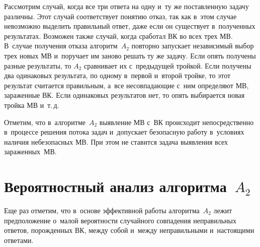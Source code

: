 \begin{multicols}{2}
{}
  
  Рассмотрим случай, когда все три ответа на одну и~ту же поставленную задачу 
различны. Этот случай соответствует понятию отказ, так как в~этом случае 
невозможно выделить правильный ответ, даже если он существует в~полученных 
результатах. Возможен также случай, когда сработал ВК во всех трех МВ. 
В~случае получения отказа алгоритм~$A_2$ повторно запускает независимый 
выбор трех новых МВ и~поручает им заново решать ту же задачу. Если опять 
получены разные результаты, то $A_2$ сравнивает их с~предыдущей тройкой. 
Если получены два одинаковых результата, по одному в~первой и~второй тройке, то 
этот результат считается правильным, а~все несовпадающие с~ним определяют 
МВ, зараженные ВК. Если одинаковых результатов нет, то опять выбирается новая 
тройка МВ и~т.\,д.
{

}
  
  Отметим, что в~алгоритме~$A_2$ выявление МВ с~ВК происходит 
непосредственно в~процессе решения потока задач и~допускает безопасную работу 
в~условиях наличия небезопасных МВ. При этом не ставится задача выявления 
всех зараженных~МВ.
{

}
  
  \section{Вероятностный анализ алгоритма~$A_2$}
  
  Еще раз отметим, что в~основе эффективной работы алгоритма~$A_2$ лежит 
предположение о~малой вероятности случайного совпадения неправильных 
ответов, порожденных ВК, между собой и~между неправильными и~настоящими 
ответами.
  

\end{multicols}
